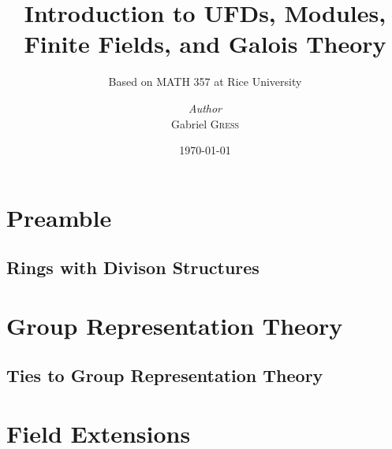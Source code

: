 \documentclass{memoir}
\institute{Rice University}
\title{Introduction to UFDs, Modules, Finite Fields, and Galois Theory}
\subtitle{Based on MATH 357 at Rice University}
\author{\textit{Author}\\ Gabriel \textsc{Gress}}
\date{\today}
\begin{document}
\maketitle

\tableofcontents

\setcounter{chapter}{-1}

\chapter{Preamble}
\label{cha:preamble}




\section{Rings with Divison Structures}
\label{sec:rings_with_divison_structures}










\chapter{Group Representation Theory}
\label{cha:group_representation_theory}

\section{Ties to Group Representation Theory}
\label{sec:ties_to_group_representation_theory}






\chapter{Field Extensions}
\label{cha:field_extensions}






















\end{document}
